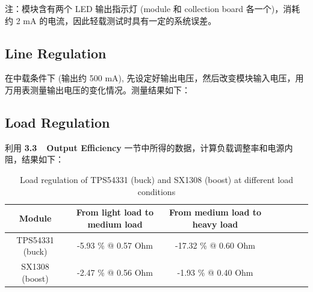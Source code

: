 \documentclass[UTF8]{article}
\begin{document}
\noindent 注：模块含有两个 LED 输出指示灯 (module 和 collection board 各一个)，消耗约 2 mA 的电流，因此轻载测试时具有一定的系统误差。


\subsection{Line Regulation}

在中载条件下 (输出约 500 mA), 先设定好输出电压，然后改变模块输入电压，用万用表测量输出电压的变化情况。测量结果如下：


\begin{table}[H]\centering
    \caption{Line regulation of TPS54331 (buck) at different input voltages}
\end{table}

\subsection{Load Regulation}

利用 \textbf{3.3\ \ Output Efficiency} 一节中所得的数据，计算负载调整率和电源内阻，结果如下：

\begin{table}[H]\centering
    \caption{Load regulation of TPS54331 (buck) and SX1308 (boost) at different load conditions}
\begin{tabular}{cccccccc}\hline
    Module & From light load to medium load & From medium load to heavy load \\
    \hline
    TPS54331 (buck) & -5.93 \% @ 0.57 Ohm & -17.32 \% @ 0.60 Ohm \\
    SX1308 (boost)  & -2.47 \% @ 0.56 Ohm & -1.93 \%  @ 0.40 Ohm \\
    \hline
\end{tabular}
\end{table}
\end{document}
